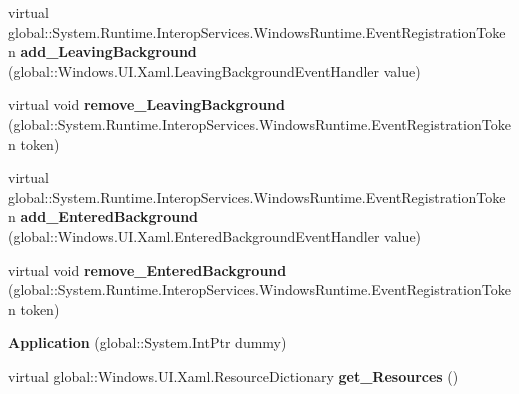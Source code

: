 \begin{DoxyCompactItemize}
\item 
\mbox{\label{class_windows_1_1_u_i_1_1_xaml_1_1_application_a652fc06a2f576820519f4a6302fa3a92}} 
virtual global\+::\+System.\+Runtime.\+Interop\+Services.\+Windows\+Runtime.\+Event\+Registration\+Token {\bfseries add\+\_\+\+Leaving\+Background} (global\+::\+Windows.\+U\+I.\+Xaml.\+Leaving\+Background\+Event\+Handler value)
\item 
\mbox{\label{class_windows_1_1_u_i_1_1_xaml_1_1_application_a33a3ccc165dd32a08e6cbc543ea18565}} 
virtual void {\bfseries remove\+\_\+\+Leaving\+Background} (global\+::\+System.\+Runtime.\+Interop\+Services.\+Windows\+Runtime.\+Event\+Registration\+Token token)
\item 
\mbox{\label{class_windows_1_1_u_i_1_1_xaml_1_1_application_a1ea6c3f747b180eb0e3d0485f1427ce1}} 
virtual global\+::\+System.\+Runtime.\+Interop\+Services.\+Windows\+Runtime.\+Event\+Registration\+Token {\bfseries add\+\_\+\+Entered\+Background} (global\+::\+Windows.\+U\+I.\+Xaml.\+Entered\+Background\+Event\+Handler value)
\item 
\mbox{\label{class_windows_1_1_u_i_1_1_xaml_1_1_application_a09062e367c18c1fcc02e683a68c8f793}} 
virtual void {\bfseries remove\+\_\+\+Entered\+Background} (global\+::\+System.\+Runtime.\+Interop\+Services.\+Windows\+Runtime.\+Event\+Registration\+Token token)
\item 
\mbox{\label{class_windows_1_1_u_i_1_1_xaml_1_1_application_a90eb3297ba9bfe5ad1c0d720af9b8066}} 
{\bfseries Application} (global\+::\+System.\+Int\+Ptr dummy)
\item 
\mbox{\label{class_windows_1_1_u_i_1_1_xaml_1_1_application_a34b9be50f5ce3d03d0f641d57ed74c72}} 
virtual global\+::\+Windows.\+U\+I.\+Xaml.\+Resource\+Dictionary {\bfseries get\+\_\+\+Resources} ()
\item 
\mbox{\label{class_windows_1_1_u_i_1_1_xaml_1_1_application_a3fdd0d36fb6e5880c92fd8b205ab9cda}} 

\end{DoxyCompactItemize}
